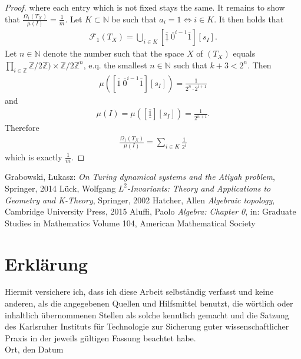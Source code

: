 \documentclass[12pt,a4paper]{scrartcl}
\numberwithin{equation}{section}
\newcommand{\Z}{\mathbb{Z}} %
\newcommand{\N}{\mathbb{N}} %
\newcommand{\2}{\mathbb{Z} / 2 \mathbb{Z}}
\newcommand{\1}{\overline{1}}
\newcommand{\0}{\overline{0}}
\begin{document}
\begin{proof}
	where each entry which is not fixed stays the same. 
	It remains to show that $\frac{\Omega_1(T_X)}{\mu(I)} = \frac{1}{m}$. Let $K \subset \N$ be such that $a_i = 1 \Leftrightarrow i \in K$. It then holds that
	\begin{align*}
		\mathcal{F}_1(T_X) = \bigcup_{i \in K}[\underline{\1} \ \0^{i-1} \1][s_I].
	\end{align*}
	Let $n \in \N$ denote the number such that the space $X$ of $(T_X)$ equals $\prod_{i \in \Z} \2) \times \2^n$, e.q. the smallest $n \in \N$ such that $k+3 < 2^n$. Then 
	\begin{align*}
		\mu([\underline{\1} \ \0^{i-1} \1][s_I]) = \frac{1}{2^n \cdot 2^ {i + 1}}
	\end{align*}
	and
	\begin{align*}
		\mu(I) = \mu([\underline{\1}][s_I]) = \frac{1}{2^{n + 1}}.
	\end{align*}
	Therefore 
	\begin{align*}
		\frac{\Omega_1(T_X)}{\mu(I)} = \sum_{i \in K} \frac{1}{2^i}
	\end{align*}
	which is exactly $\frac{1}{m}$.
\end{proof}

  \newpage

\begin{thebibliography}{Lam00}
  Grabowski, \L ukasz: \emph{On Turing dynamical systems and the Atiyah problem}, Springer, 2014
  Lück, Wolfgang $L^2$\emph{-Invariants: Theory and Applications to Geometry and K-Theory}, Springer, 2002
  Hatcher, Allen \emph{Algebraic topology}, Cambridge University Press, 2015
  Aluffi, Paolo \emph{Algebra: Chapter 0}, in: Graduate Studies in Mathematics Volume 104, American Mathematical Society
\end{thebibliography}
 
      

\newpage
  
 \thispagestyle{empty}


\vspace*{8cm}


\section*{Erklärung}

Hiermit versichere ich, dass ich diese Arbeit selbständig verfasst und keine anderen, als die angegebenen Quellen und Hilfsmittel benutzt, die wörtlich oder inhaltlich übernommenen Stellen als solche kenntlich gemacht und die Satzung des Karlsruher Instituts für Technologie zur Sicherung guter wissenschaftlicher Praxis in der jeweils gültigen Fassung beachtet habe. \\[2ex] 

\noindent
Ort, den Datum\\[5ex]

\end{document}
